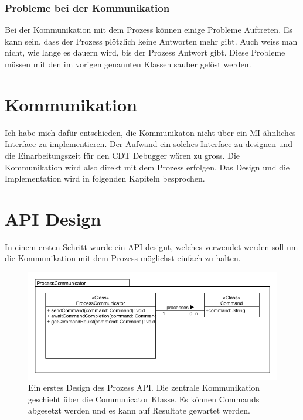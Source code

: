 \subsubsection{Probleme bei der Kommunikation}

Bei der Kommunikation mit dem Prozess können einige Probleme Auftreten. Es kann sein, dass der Prozess plötzlich keine Antworten mehr gibt. Auch weiss man nicht, wie lange es dauern wird, bis der Prozess Antwort gibt. Diese Probleme müssen mit den im vorigen genannten Klassen sauber gelöst werden.

\section{Kommunikation}

Ich habe mich dafür entschieden, die Kommunikaton nicht über ein MI ähnliches Interface zu implementieren. Der Aufwand ein solches Interface zu designen und die Einarbeitungszeit für den CDT Debugger wären zu gross. Die Kommunikation wird also direkt mit dem Prozess erfolgen. Das Design und die Implementation wird in folgenden Kapiteln besprochen.


\section{API Design}

In einem ersten Schritt wurde ein API designt, welches verwendet werden soll um die Kommunikation mit dem Prozess möglichst einfach zu halten.

\begin{figure}[H]
	\centering
		\includegraphics[scale=0.6]{forthcommunication/api.png}
		\caption{Ein erstes Design des Prozess API. Die zentrale Kommunikation geschieht über die Communicator Klasse. Es können Commands abgesetzt werden und es kann auf Resultate gewartet werden.}
		\label{fig:extensionpoint}
\end{figure}

